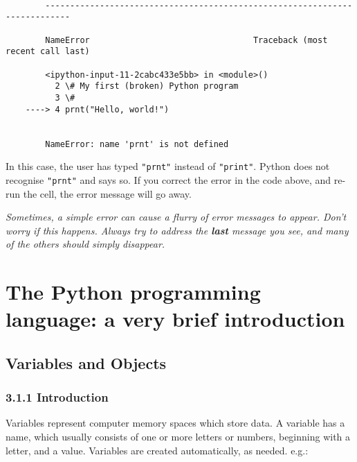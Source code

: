 \documentclass[10pt]{article}
\begin{document}
    \begin{Verbatim}[commandchars=\\\{\}]

        ---------------------------------------------------------------------------

        NameError                                 Traceback (most recent call last)

        <ipython-input-11-2cabc433e5bb> in <module>()
          2 \# My first (broken) Python program
          3 \#
    ----> 4 prnt("Hello, world!")
    

        NameError: name 'prnt' is not defined

    \end{Verbatim}

    In this case, the user has typed \texttt{"prnt"} instead of
\texttt{"print"}. Python does not recognise \texttt{"prnt"} and says so.
If you correct the error in the code above, and re-run the cell, the
error message will go away.

\emph{Sometimes, a simple error can cause a flurry of error messages to
appear. Don't worry if this happens. Always try to address the
\textbf{last} message you see, and many of the others should simply
disappear.}

    \hypertarget{the-python-programming-language-a-very-brief-introduction}{%
\section{The Python programming language: a very brief
introduction}\label{the-python-programming-language-a-very-brief-introduction}}

\hypertarget{variables-and-objects}{%
\subsection{Variables and Objects}\label{variables-and-objects}}

\hypertarget{introduction}{%
\subsubsection*{3.1.1 Introduction}\label{introduction}}

Variables represent computer memory spaces which store data. A variable
has a name, which usually consists of one or more letters or numbers,
beginning with a letter, and a value. Variables are created
automatically, as needed. e.g.:
\end{document}
